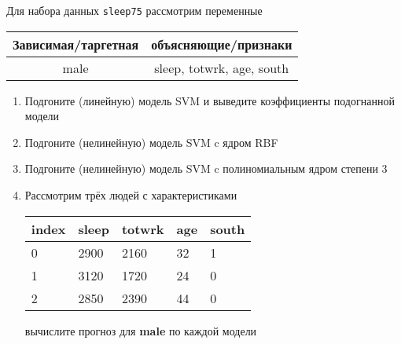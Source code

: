 \begin{exercise}
Для набора данных \texttt{sleep75} рассмотрим переменные

\begin{center}
	\begin{tabular}{|c|c|} \hline
		Зависимая/таргетная & объясняющие/признаки \\ \hline
		male & sleep, totwrk, age, south \\ \hline
	\end{tabular}
\end{center}

\begin{enumerate}
	\item Подгоните (линейную) модель SVM и выведите коэффициенты подогнанной модели
	\item Подгоните (нелинейную) модель SVM c ядром RBF
	\item Подгоните (нелинейную) модель SVM c полиномиальным ядром степени 3
	\item Рассмотрим трёх людей с характеристиками
	\begin{center}
		\begin{tabular}{|l||l|l|l|l|}\hline
			index & sleep & totwrk & age & south  \\ \hline\hline
			0 & 2900 & 2160 & 32 & 1  \\
			1 & 3120 & 1720 & 24 & 0  \\
			2 & 2850 & 2390 & 44 & 0  \\ \hline
		\end{tabular}
	\end{center}
	вычислите прогноз для \textbf{male} по каждой модели
\end{enumerate}
\end{exercise}

